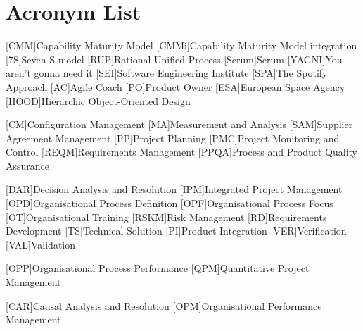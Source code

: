 \chapter{Acronym List}

\begin{acronym}[AAAAA]
    [CMM]{Capability Maturity Model}
    [CMMi]{Capability Maturity Model integration}
    [7S]{Seven S model}
    [RUP]{Rational Unified Process}
    [Scrum]{Scrum}
    [YAGNI]{You aren't gonna need it}
    [SEI]{Software Engineering Institute}
    [SPA]{The Spotify Approach}
    [AC]{Agile Coach}
    [PO]{Product Owner}
    [ESA]{European Space Agency}
    [HOOD]{Hierarchic Object-Oriented Design}
    
    
        [CM]{Configuration Management}
        [MA]{Measurement and Analysis}
        [SAM]{Supplier Agreement Management}
        [PP]{Project Planning}
        [PMC]{Project Monitoring and Control}
        [REQM]{Requirements Management}
        [PPQA]{Process and Product Quality Assurance}
        
        [DAR]{Decision Analysis and Resolution}
        [IPM]{Integrated Project Management}
        [OPD]{Organisational Process Definition}
        [OPF]{Organisational Process Focus}
        [OT]{Organisational Training}
        [RSKM]{Risk Management}
        [RD]{Requirements Development}
        [TS]{Technical Solution}
        [PI]{Product Integration}
        [VER]{Verification}
        [VAL]{Validation}
        
        [OPP]{Organisational Process Performance}
        [QPM]{Quantitative Project Management}
        
        [CAR]{Causal Analysis and Resolution}
        [OPM]{Organisational Performance Management}
        
\end{acronym}